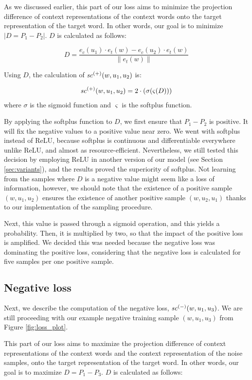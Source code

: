 As we discussed earlier, this part of our loss aims to minimize the projection difference of context representations of the context words onto the target representation of the target word. In other words, our goal is to minimize $| D = P_1 - P_2 |$. $D$ is calculated as follows:

\[ D = \frac{e_c(u_1) \cdot e_t(w) - e_c(u_2) \cdot e_t(w)}{\left \| e_t(w) \right \|}\]

Using $D$, the calculation of $\mathit{sc}^{({+})}({w, u_1, u_2})$ is:

\[ 
\mathit{sc}^{({+})}({w, u_1, u_2}) = 2 \cdot (\sigma( \varsigma  (D) ))
\]
\noindent
where $\sigma$ is the sigmoid function and $\varsigma$ is the softplus function.

By applying the softplus function to $D$, we first ensure that $P_1 - P_2$ is positive. It will fix the negative values to a positive value near zero. We went with softplus instead of \ac{ReLU}, because softplus is continuous and differentiable everywhere unlike \ac{ReLU}, and almost as resource-efficient. Nevertheless, we still tested this decision by employing \ac{ReLU} in another version of our model (see Section \ref{sec:variants}), and the results proved the superiority of softplus. Not learning from the samples where $D$ is a negative value might seem like a loss of information, however, we should note that the existence of a positive sample $(w, u_1, u_2)$ ensures the existence of another positive sample $(w, u_2, u_1)$ thanks to our implementation of the sampling procedure.

Next, this value is passed through a sigmoid operation, and this yields a probability. Then, it is multiplied by two, so that the impact of the positive loss is amplified. We decided this was needed because the negative loss was dominating the positive loss, considering that the negative loss is calculated for five samples per one positive sample.

\subsection{Negative loss}
\label{sec:neg_loss}

Next, we describe the computation of the negative loss, $\mathit{sc}^{({-})}({w, u_1, u_3})$. We are still proceeding with our example negative training sample $(w, u_1, u_3)$ from Figure \ref{fig:loss_plot}.

This part of our loss aims to maximize the projection difference of context representations of the context words and the context representation of the noise samples, onto the target representation of the target word. In other words, our goal is to maximize $D = P_1 - P_3$. $D$ is calculated as follows:


